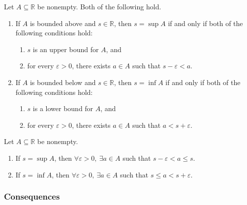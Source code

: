 \begin{proposition}
\label{prop:eps-char}
Let $A \subseteq \mathbb{R}$ be nonempty. Both of the following hold.
\begin{enumerate}
  \item If $A$ is bounded above and $s \in \mathbb{R}$, then $s = \sup A$
        if and only if both of the following conditions hold:
        \begin{enumerate}[label=(\alph*)]

          \item $s$ is an upper bound for $A$, and
          \item for every $\varepsilon > 0$, there exists $a \in A$ such that
                $s - \varepsilon < a$.
        \end{enumerate}
  \item If $A$ is bounded below and $s \in \mathbb{R}$, then $s = \inf A$
        if and only if both of the following conditions hold:
        \begin{enumerate}[label=(\alph*)]
          \item $s$ is a lower bound for $A$, and
          \item for every $\varepsilon > 0$, there exists $a \in A$ such that
                $a < s + \varepsilon$.
        \end{enumerate}
\end{enumerate}
\end{proposition}

\begin{corollary}
\label{cor:eps-approx}
Let $A \subseteq \mathbb{R}$ be nonempty.
\begin{enumerate}
  \item If $s = \sup A$, then
        $\forall \varepsilon > 0,\ \exists a \in A$ such that
        $s - \varepsilon < a \le s$.
  \item If $s = \inf A$, then
        $\forall \varepsilon > 0,\ \exists a \in A$ such that
        $s \le a < s + \varepsilon$.
\end{enumerate}
\end{corollary}

\subsubsection{Consequences}

